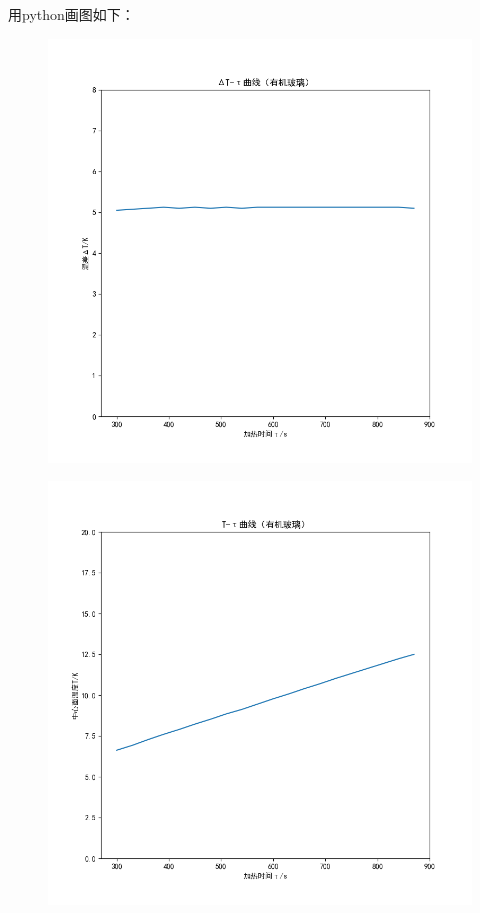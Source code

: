\documentclass[signature=data]{physicsreport}
\begin{document}
\hspace{2em}
用python画图如下：
\begin{figure}[htbp]
	\centering
	\begin{minipage}{0.49\linewidth}
		\centering
		\includegraphics[width=0.9\linewidth]{images/lab9/Figure_1.png}
		\label{chutian1}%
	\end{minipage}
	\begin{minipage}{0.49\linewidth}
		\centering
		\includegraphics[width=0.9\linewidth]{images/lab9/Figure_2.png}
		\label{chutian2}%
	\end{minipage}
\end{figure}
\end{document}
